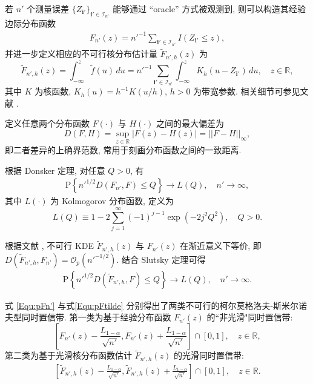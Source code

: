\documentclass[a4paper,openay,14pt]{ctexbook}
\numberwithin{equation}{section}
\numberwithin{lem}{section}
\begin{document}
若 $n'$ 个测量误差 $\{Z_{\mathbf{i}'}\}_{\mathbf{i}' \in \mathcal{I}_{n'}}$ 能够通过 ``oracle'' 方式被观测到, 则可以构造其经验边际分布函数
\begin{align*}
F_{n'}(z) = n'^{-1} \sum_{\mathbf{i}' \in \mathcal{I}_{n'}} I\left(Z_{\mathbf{i}'} \le z\right),
\end{align*}
并进一步定义相应的不可行核分布估计量 $\tilde{F}_{n',h}(z)$ 为
\begin{equation}\label{EQ:Fn'tilde}
\tilde{F}_{n',h}(z)
= \int_{-\infty}^{z} \tilde{f}(u) \, du
= n'^{-1} \sum_{\mathbf{i}' \in \mathcal{I}_{n'}}
\int_{-\infty}^{z} K_h(u - Z_{\mathbf{i}'}) \, du, 
\quad z \in \mathbb{R},
\end{equation}
其中 $K$ 为核函数, $K_h(u) = h^{-1} K(u/h)$, $h>0$ 为带宽参数. 相关细节可参见文献 \cite{wang2013smooth}.

定义任意两个分布函数 $F(\cdot)$ 与 $H(\cdot)$ 之间的最大偏差为
\begin{equation}\label{EQ:D(F,H)}
D(F,H) = \sup_{z \in \mathbb{R}} |F(z) - H(z)| = ||F - H||_{\infty},
\end{equation}
即二者差异的上确界范数, 常用于刻画分布函数之间的一致距离.

根据 Donsker 定理, 对任意 $Q>0$, 有
\begin{align}\label{Equ:pFn'}
\mathrm{P}\left\{ n'^{1/2} D\left(F_{n'}, F\right) \le Q \right\}
\rightarrow L(Q), \quad n' \rightarrow \infty,
\end{align}
其中 $L(\cdot)$ 为 Kolmogorov 分布函数, 定义为
\[
L(Q) \equiv 1 - 2 \sum_{j=1}^{\infty} (-1)^{j-1} \exp\left(-2 j^2 Q^2\right), 
\quad Q>0.
\]

根据文献 \cite{wang2013smooth}, 不可行 KDE $\tilde{F}_{n',h}(z)$ 与 $F_{n'}(z)$ 在渐近意义下等价, 即
$D(\tilde{F}_{n',h}, F_{n'}) = \mathcal{O}_p(n'^{-1/2})$. 结合 Slutsky 定理可得
\begin{align}\label{Equ:pFtilde}
\mathrm{P}\left\{ n'^{1/2} D\left(\tilde{F}_{n',h}, F\right) \le Q \right\}
\rightarrow L(Q), \quad n' \rightarrow \infty.
\end{align}

式 \eqref{Equ:pFn'} 与式\eqref{Equ:pFtilde} 分别得出了两类不可行的柯尔莫格洛夫-斯米尔诺夫型同时置信带. 第一类为基于经验分布函数 $F_{n'}(z)$ 的``非光滑"同时置信带:
\[
\left[
F_{n'}(z) - \frac{L_{1-\alpha}}{\sqrt{n'}},
F_{n'}(z) + \frac{L_{1-\alpha}}{\sqrt{n'}}
\right] \cap [0,1], 
\quad z \in \mathbb{R},
\]
第二类为基于光滑核分布函数估计 $\tilde{F}_{n',h}(z)$ 的光滑同时置信带:
\begin{align} \label{SCB:Ftilden'}
    \left[ \tilde{F}_{n',h}(z) - \frac{L_{1-\alpha}}{\sqrt{n'}},\tilde{F}_{n',h}(z) + \frac{L_{1-\alpha}}{\sqrt{n'}} \right] \cap [0,1], \quad z \in \mathbb{R}.
\end{align}
\end{document}
